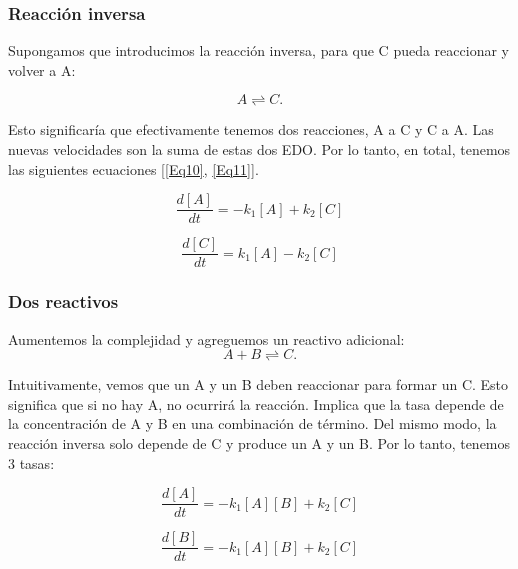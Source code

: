 \documentclass[11pt, letterpaper, spanish]{article}
\begin{document}
{    \subsubsection{Reacción inversa}

    \par{Supongamos que introducimos la reacción inversa, para que C pueda reaccionar y volver a A: }

    \begin{equation}
        A \rightleftharpoons C.
    \end{equation}

     \par{Esto significaría que efectivamente tenemos dos reacciones, A a C y C a A. Las nuevas velocidades son la suma de estas dos EDO. Por lo tanto, en total, tenemos las siguientes ecuaciones [\ref{Eq10}, \ref{Eq11}]. }

     \begin{equation}
        \frac{d [A]}{d t}=-k_1[A]+k_2[C]
         \label{Eq10}
    \end{equation}


    \begin{equation}
        \frac{d [C]}{d t}=k_1[A]-k_2[C]
         \label{Eq11}
    \end{equation}

 \subsubsection{Dos reactivos}

    \par{Aumentemos la complejidad y agreguemos un reactivo adicional:}
    \begin{equation}
        A+B \rightleftharpoons C.
        \label{eq12}
    \end{equation}

\par{Intuitivamente, vemos que un A y un B deben reaccionar para formar un C. Esto significa que si no hay A, no ocurrirá la reacción. Implica que la tasa depende de la concentración de A y B en una combinación de término. Del mismo modo, la reacción inversa solo depende de C y produce un A y un B. Por lo tanto, tenemos 3 tasas: }

\begin{equation}
        \frac{d [A]}{d t}=-k_1[A][B]+k_2[C]
        \label{eq13}
    \end{equation}

    \begin{equation}
        \frac{d [B]}{d t}=-k_1[A][B]+k_2[C]
        \label{eq14}
    \end{equation}

}
\end{document}
